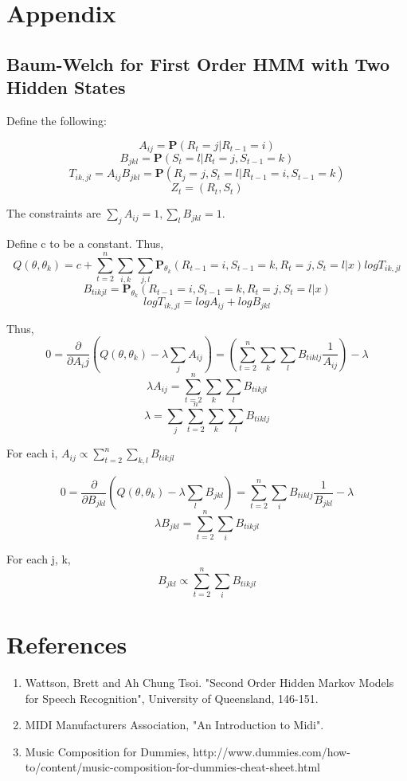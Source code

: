 \documentclass{article} %
\begin{document}
\newpage

\section{Appendix}

\subsection{Baum-Welch for First Order HMM with Two Hidden States}

Define the following:

$$A_{ij} = \textbf{P} (R_t = j | R_{t-1} = i)$$
$$B_{jkl} = \textbf{P} (S_t = l | R_t = j, S_{t-1} = k)$$ 
$$T_{ik, jl} = A_{ij} B_{jkl} = \textbf{P} (R_j = j, S_t = l | R_{t-1} = i, S_{t-1} = k)$$
$$Z_t = (R_t, S_t)$$

The constraints are $\sum_j A_{ij} = 1, \sum_l B_{jkl} = 1.$ \newline

Define c to be a constant. Thus,  \newline
$$Q(\theta, \theta_k) = c + \sum_{t=2}^n \sum_{i,k} \sum_{j,l} \textbf{P}_{\theta_k} (R_{t-1} = i, S_{t-1} = k, R_t = j, S_t = l | x) log T_{ik, jl}$$ 
$$B_{tikjl} = \textbf{P}_{\theta_k} (R_{t-1} = i, S_{t-1} = k, R_t = j, S_t = l | x)$$
$$log T_{ik, jl} = log A_{ij} + log B_{jkl}$$

Thus, \newline
$$ 0 = \frac{\partial}{\partial A_ij}(Q(\theta, \theta_k) - \lambda \sum_{j} A_{ij}) = (\sum_{t=2}^n \sum_k \sum_l B_{tiklj} \frac{1}{A_{ij}}) - \lambda$$
$$\lambda A_{ij} = \sum_{t=2}^n \sum_k \sum_l B_{tikjl}$$
$$\lambda = \sum_j \sum_{t=2}^n \sum_k \sum_l B_{tiklj}$$

For each i, $A_{ij} \propto \sum_{t=2}^n \sum_{k,l} B_{tikjl}$ \newline

$$ 0 = \frac{\partial}{\partial B_{jkl}} (Q(\theta, \theta_k) - \lambda \sum_l B_{jkl}) = \sum_{t=2}^n \sum_i B_{tiklj} \frac{1}{B_{jkl}} - \lambda$$
$$ \lambda B_{jkl} = \sum_{t=2}^n \sum_i B_{tikjl}$$

For each j, k, \newline
$$B_{jkl} \propto \sum_{t=2}^n \sum_i B_{tikjl}$$

\newpage

\section{References}
\begin{enumerate}
\item Wattson, Brett and Ah Chung Tsoi. "Second Order Hidden Markov Models for Speech Recognition", University of Queensland, 146-151. 
\item MIDI Manufacturers Association, "An Introduction to Midi". 
\item Music Composition for Dummies, http://www.dummies.com/how-to/content/music-composition-for-dummies-cheat-sheet.html
\end{enumerate}
\end{document}
